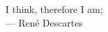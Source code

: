 \cleardoublepage
\thispagestyle{empty}


\vspace*{3cm}

\begin{raggedleft}
    	I think, therefore I am;\\
     --- René Descartes\\
\end{raggedleft}

\vspace{4cm}



